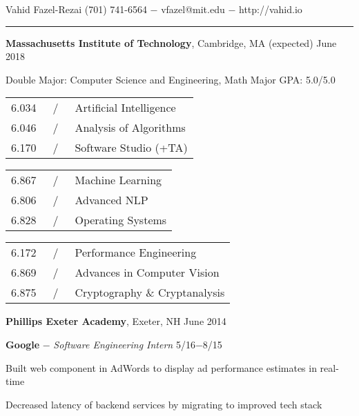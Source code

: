 \documentclass[11pt]{article}
\newcommand{\msection}[1]{\vspace{1em}\marginnote{#1}} %
\newcommand{\bt}[1]{\textbf{#1}} %
\newcommand{\gap}[0]{\vspace{0.6em}} %
\newcommand{\dash}[0]{ $-$ } %
\newcommand{\tabsep}[0]{\, / \,} %
\begin{document}

{\Huge Vahid Fazel-Rezai} \hfill  (701) 741-6564\dash vfazel@mit.edu\dash http://vahid.io

\vspace{0.4em}

\hspace{-1.2in}\rule{7.9in}{0.2em}

\vspace{-0.2em}



\msection{Education}

\bt{Massachusetts Institute of Technology}, Cambridge, MA \hfill (expected) June 2018

Double Major: Computer Science and Engineering, Math \hfill Major GPA: 5.0/5.0




\vspace{0.15em}\begin{tabular}{rcl}
6.034 & \tabsep & Artificial Intelligence \\
6.046 & \tabsep & Analysis of Algorithms \\
6.170 & \tabsep & Software Studio (+TA)
\end{tabular}
\hfill
\begin{tabular}{rcl}
6.867 & \tabsep & Machine Learning \\
6.806 & \tabsep & Advanced NLP \\
6.828 & \tabsep & Operating Systems
\end{tabular}
\hfill
\begin{tabular}{rcl}
6.172 & \tabsep & Performance Engineering \\
6.869 & \tabsep & Advances in Computer Vision \\
6.875 & \tabsep & Cryptography \& Cryptanalysis
\end{tabular}

\gap

\bt{Phillips Exeter Academy}, Exeter, NH \hfill June 2014



\msection{Work}

\bt{Google}\dash \emph{Software Engineering Intern} \hfill 5/16$-$8/15

Built web component in AdWords to display ad performance estimates in real-time

Decreased latency of backend services by migrating to improved tech stack

\gap
\end{document}
